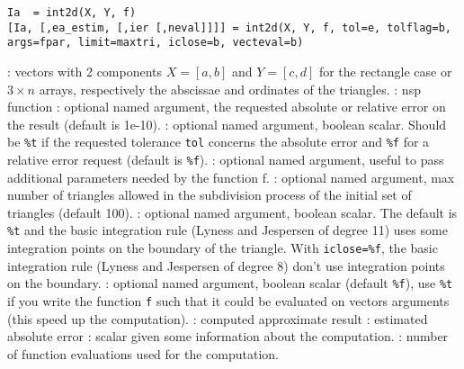
\begin{mandesc}
\end{mandesc}

\begin{calling_sequence}
\begin{verbatim}
Ia  = int2d(X, Y, f)
[Ia, [,ea_estim, [,ier [,neval]]]] = int2d(X, Y, f, tol=e, tolflag=b, args=fpar, limit=maxtri, iclose=b, vecteval=b)
\end{verbatim}
\end{calling_sequence}
\begin{parameters}
  \begin{varlist}
    : vectors with 2 components $X=[a,b]$ and $Y=[c,d]$ for
    the rectangle case or  $3 \times n$ arrays, respectively the
    abscissae and ordinates of the triangles.
    : nsp function
    : optional named argument, the requested absolute or
    relative error on the result (default is 1e-10).
    : optional named argument, boolean scalar. Should be
    \verb+%t+ if the requested tolerance \verb+tol+ concerns the absolute
     error and \verb+%f+ for a relative error request (default is \verb+%f+).
    : optional named argument, useful to pass
    additional parameters needed by the function f.
    : optional named argument, max number of
    triangles allowed in the subdivision process of the initial set of
    triangles (default 100).
    : optional named argument, boolean scalar. The
    default is \verb+%t+ and the basic integration rule (Lyness and 
    Jespersen of degree 11) uses some integration points on the
    boundary of the triangle. With \verb+iclose=%f+, the basic
    integration rule (Lyness and Jespersen of degree 8) don't
    use integration points on the boundary.
    : optional named argument, boolean scalar
    (default \verb+%f+), use \verb+%t+ if you write the function
    \verb+f+ such that it could be evaluated on vectors arguments 
    (this speed up the computation).
    : computed approximate result
    : estimated absolute error
    : scalar given some information about the computation.
    : number of function evaluations used for the computation.
  \end{varlist}
\end{parameters}

